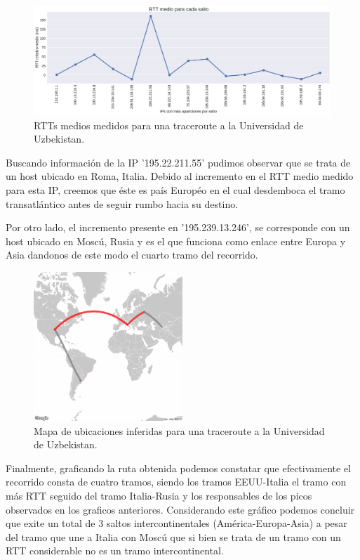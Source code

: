 \begin{figure}[H]
   \centering
       \includegraphics[width=1\textwidth, height=1\textheight, keepaspectratio]{../img/nuu-uz-rtts}
 \caption{RTTs medios medidos para una traceroute a la Universidad de Uzbekistan.}
 \label{fig:nuu-uz-rtts}
\end{figure}

Buscando información de la IP '195.22.211.55' pudimos observar que se trata de un host ubicado en Roma, Italia. Debido al incremento en el RTT medio medido para esta IP, creemos que éste es país Européo en el cual desdemboca el tramo transatlántico antes de seguir rumbo hacia su destino. \par

Por otro lado, el incremento presente en '195.239.13.246', se corresponde con un host ubicado en Moscú, Rusia y es el que funciona como enlace entre Europa y Asia dandonos de este modo el cuarto tramo del recorrido.\par

\begin{figure}[H]
   \centering
       \includegraphics[width=0.5\textwidth, keepaspectratio]{../img/nuu-uz-map}
 \caption{Mapa de ubicaciones inferidas para una traceroute a la Universidad de Uzbekistan.}
 \label{fig:nuu-uz-map}
\end{figure}


Finalmente, graficando la ruta obtenida podemos constatar que efectivamente el recorrido consta de cuatro tramos, siendo los tramos EEUU-Italia el tramo con más RTT seguido del tramo Italia-Rusia y los responsables de los picos observados en los graficos anteriores. Considerando este gráfico podemos concluir que exite un total de 3 saltos intercontinentales (América-Europa-Asia) a pesar del tramo que une a Italia con Moscú que si bien se trata de un tramo con un RTT considerable no es un tramo intercontinental.\par

